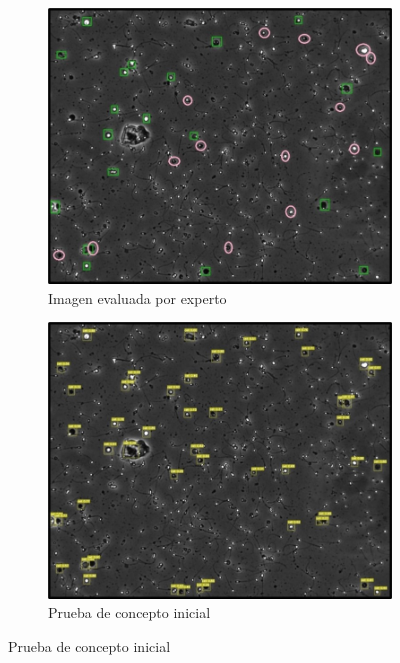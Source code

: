 \documentclass[12pt,a4paper,onecolumn,oneside]{report}
\begin{document}
\begin{figure}[H]
  \centering
  \begin{subfigure}[b]{0.48\textwidth}
    \centering
    \includegraphics[width=\textwidth]{figuras/evaluacion_cualitativa/415/415.jpg}
    \caption{Imagen evaluada por experto}
    \label{fig:exp_image_415}
  \end{subfigure}
  \hfill
  \begin{subfigure}[b]{0.48\textwidth}
    \centering
    \includegraphics[width=\textwidth]{figuras/evaluacion_cualitativa/415/415_v7.jpg}
    \caption{Prueba de concepto inicial}
    \label{fig:poc_image_415}
  \end{subfigure}
  

\end{figure}
\end{document}

